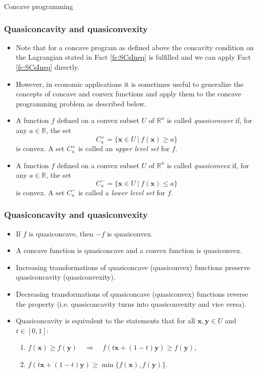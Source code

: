 \documentclass[10pt]{beamer}
\theoremstyle{definition}
\begin{document}
\begin{section}{Concave programming}
\begin{frame}[fragile]
\frametitle{Quasiconcavity and quasiconvexity}
\begin{itemize}
\item Note that for a concave program as defined above the concavity condition on the Lagrangian stated in Fact \ref{fc:SCsIneq} is fulfilled and we can apply Fact \ref{fc:SCsIneq} directly.
\item However, in economic applications it is sometimes useful to generalize the concepts of concave and convex functions and apply them to the concave programming problem as described below.
\item A function $ f $ defined on a convex subset $ U $ of $ \mathbb{R}^n $ is called \emph{quasiconcave} if, for any $ a \in \mathbb{R} $, the set \[ C^+_a  = \{\mathbf{x} \in U ~|~ f(\mathbf{x})\geq a \} \] is convex. A set $ C^+_a  $ is called an \emph{upper level set} for $ f $.
\item A function $ f $ defined on a convex subset $ U $ of $ \mathbb{R}^n $ is called \emph{quasiconvex} if, for any $ a \in \mathbb{R} $, the set \[ C^-_a  = \{\mathbf{x} \in U ~|~ f(\mathbf{x})\leq a \} \] is convex. A set $ C^-_a  $ is called a \emph{lower level set} for $ f $.
\end{itemize}
\end{frame}

\begin{frame}[fragile]
\frametitle{Quasiconcavity and quasiconvexity}
\begin{itemize}
\item If $ f $ is quasiconcave, then $ -f $ is quasiconvex.\bigskip
\item A concave function is quasiconcave and a convex function is quasiconvex.\bigskip
\item Increasing transformations of quasiconcave (quasiconvex) functions preserve quasiconcavity (quasiconvexity).\bigskip
\item Decreasing transformations of quasiconcave (quasiconvex) functions reverse the property (i.e. quasiconcavity turns into quasiconvexity and vice versa).\bigskip
\item Quasiconcavity is equivalent to the statements that for all $ \mathbf{x},\mathbf{y} \in U $ and $ t \in [0,1] $: \bigskip

\begin{enumerate}
\item $ f(\mathbf{x}) \geq f(\mathbf{y})  \quad \Rightarrow \quad f(t \mathbf{x} + (1-t)\mathbf{y}) \geq f(\mathbf{y})$,\bigskip
\item $ f(t \mathbf{x} + (1-t)\mathbf{y}) \geq \min \{f(\mathbf{x}),f(\mathbf{y})\} $.
\end{enumerate}
\end{itemize}
\end{frame}


\end{section}
\end{document}
